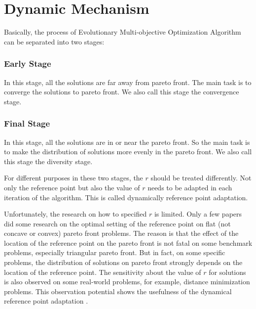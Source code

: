 \documentclass[conference]{IEEEtran}
\begin{document}
%
% 
\section{Dynamic Mechanism}
Basically, the process of Evolutionary Multi-objective Optimization Algorithm can be separated into
two stages:
\subsubsection{Early Stage} In this stage, 
all the solutions are far away from pareto front.
The main task is to converge the solutions to pareto front.
We also call this stage the convergence stage.
\subsubsection{Final Stage} In this stage,
all the solutions are in or near the pareto front.
So the main task is to make the distribution of solutions more evenly in the pareto front.
We also call this stage the diversity stage.

For different purposes in these two stages, the $r$ should be treated differently\cite{hisao:dynamic}. 
Not only the reference point but also the value of $r$ 
needs to be adapted in each iteration of the algorithm. 
This is called dynamically reference point adaptation. 

Unfortunately, the research on how to specified $r$ is limited.
Only a few papers\cite{hisao:RPexplanation, hisao:RPhowtoSpecify, hisao:RPspecify} 
did some research on the optimal setting of the reference point on 
flat (not concave or convex) pareto front problems. 
The reason is that the effect of the location of the reference point on the pareto front 
is not fatal on some benchmark problems, especially triangular pareto front. 
But in fact, on some specific problems, the distribution of solutions on pareto front
strongly depends on the location of the reference point. 
The sensitivity about the value of $r$ for solutions is also observed on some real-world problems,
for example, distance minimization problems.
This observation potential shows the usefulness of the dynamical reference point adaptation
\cite{hisao:dynamic}.
\end{document}
